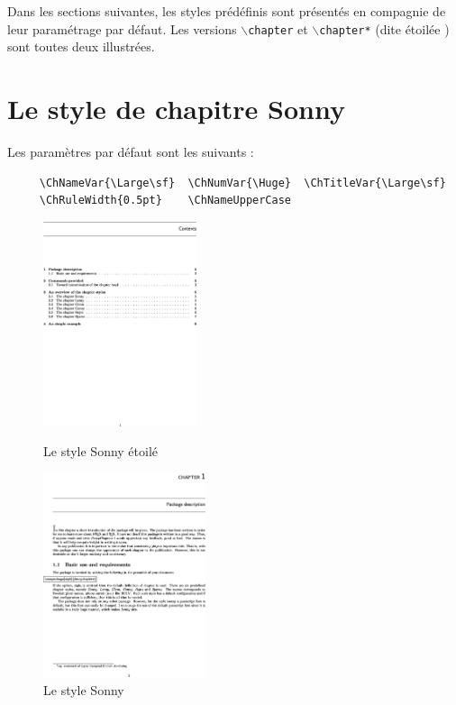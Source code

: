 \documentclass{report}
\newcommand{\A}[1]{{$\backslash${\tt #1}}}
\begin{document}
    Dans les sections suivantes, les styles prédéfinis sont présentés en 
    compagnie de leur paramétrage par défaut. Les versions \A{chapter} 
    et \A{chapter*} (dite \og étoilée \fg{}) sont toutes deux illustrées.

    \section{Le style de chapitre Sonny}
    Les paramètres par défaut sont les suivants :
    {\small\begin{verbatim}  
     \ChNameVar{\Large\sf}  \ChNumVar{\Huge}  \ChTitleVar{\Large\sf}
     \ChRuleWidth{0.5pt}    \ChNameUpperCase
    \end{verbatim}}    
    \begin{figure}[h]
      \begin{minipage}{7 cm}
        \label{fig:Sonnys}
        \centerline{\includegraphics[height=6cm]{Sonnys.eps}} 
        \caption{Le style Sonny \og étoilé \fg{}}
      \end{minipage}\hfill
      \begin{minipage}{7 cm}
        \label{fig:Sonny}
        \centerline{\includegraphics[height=6cm]{Sonny.eps}}
        \caption{Le style Sonny}
      \end{minipage}\hfill
    \end{figure}    
    
\end{document}
